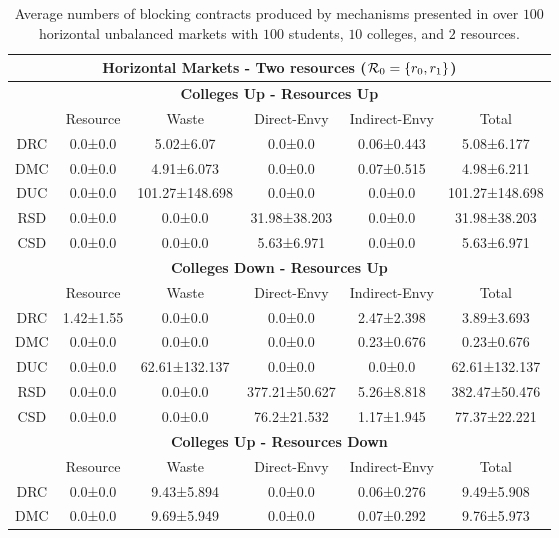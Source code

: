 \begin{table}[ht]
\centering
\small{
\caption{Average numbers of blocking contracts produced by mechanisms presented in  over $100$ horizontal unbalanced markets with $100$ students, $10$ colleges, and $2$ resources. }
\begin{tabular}{cccccc}
\toprule
\multicolumn{6}{c}{\textbf{Horizontal Markets - Two resources ($\operatorname{{\color{black}\mathcal{R}}}_0 = \{r_0,r_1\}$)}}\\
\toprule
\multicolumn{6}{c}{\textbf{Colleges Up - Resources Up}} \\
\hline
& Resource   & Waste   & Direct-Envy   & Indirect-Envy       & Total    \\
\hline
DRC & 0.0±0.0     & 5.02±6.07      & 0.0±0.0       & 0.06±0.443 & 5.08±6.177     \\
DMC & 0.0±0.0     & 4.91±6.073     & 0.0±0.0       & 0.07±0.515 & 4.98±6.211     \\
DUC & 0.0±0.0     & 101.27±148.698 & 0.0±0.0       & 0.0±0.0    & 101.27±148.698 \\
RSD & 0.0±0.0     & 0.0±0.0        & 31.98±38.203  & 0.0±0.0    & 31.98±38.203   \\
CSD & 0.0±0.0     & 0.0±0.0        & 5.63±6.971    & 0.0±0.0    & 5.63±6.971     \\
\hline
\multicolumn{6}{c}{\textbf{Colleges Down - Resources Up}} \\
\hline
& Resource   & Waste   & Direct-Envy   & Indirect-Envy       & Total    \\
\hline
DRC & 1.42±1.55   & 0.0±0.0       & 0.0±0.0       & 2.47±2.398 & 3.89±3.693    \\
DMC & 0.0±0.0     & 0.0±0.0       & 0.0±0.0       & 0.23±0.676 & 0.23±0.676    \\
DUC & 0.0±0.0     & 62.61±132.137 & 0.0±0.0       & 0.0±0.0    & 62.61±132.137 \\
RSD & 0.0±0.0     & 0.0±0.0       & 377.21±50.627 & 5.26±8.818 & 382.47±50.476 \\
CSD & 0.0±0.0     & 0.0±0.0       & 76.2±21.532   & 1.17±1.945 & 77.37±22.221  \\
\hline
\multicolumn{6}{c}{\textbf{Colleges Up - Resources Down}} \\
\hline
& Resource   & Waste   & Direct-Envy   & Indirect-Envy       & Total    \\
\hline
DRC & 0.0±0.0     & 9.43±5.894   & 0.0±0.0       & 0.06±0.276 & 9.49±5.908   \\
DMC & 0.0±0.0     & 9.69±5.949   & 0.0±0.0       & 0.07±0.292 & 9.76±5.973   \\

\end{tabular}}
\end{table}
